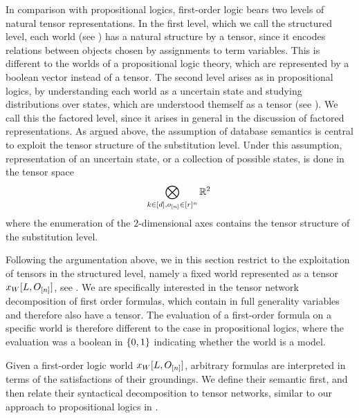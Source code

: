 In comparison with propositional logics, first-order logic bears two levels of natural tensor representations.
In the first level, which we call the structured level, each world (see ) has a natural structure by a tensor, since it encodes relations between objects chosen by assignments to term variables.
This is different to the worlds of a propositional logic theory, which are represented by a boolean vector instead of a tensor.
The second level arises as in propositional logics, by understanding each world as a uncertain state and studying distributions over states, which are understood themself as a tensor (see ).
We call this the factored level, since it arises in general in the discussion of factored representations.
As argued above, the assumption of database semantics is central to exploit the tensor structure of the substitution level.
Under this assumption, representation of an uncertain state, or a collection of possible states, is done in the tensor space
\begin{align*}
    \bigotimes_{k\in[d],o_{[n]}\in[r]^{n}} \mathbb{R}^2 \,
\end{align*}
where the enumeration of the $2$-dimensional axes contains the tensor structure of the substitution level.




Following the argumentation above, we in this section restrict to the exploitation of tensors in the structured level, namely a fixed world represented as a tensor $x_{W}[L,O_{[n]}]$, see .
We are specifically interested in the tensor network decomposition of first order formulas, which contain in full generality variables and therefore also have a tensor.
The evaluation of a first-order formula on a specific world is therefore different to the case in propositional logics, where the evaluation was a boolean in $\{0,1\}$ indicating whether the world is a model.


Given a first-order logic world $x_{W}[L,O_{[n]}]$, arbitrary formulas are interpreted in terms of the satisfactions of their groundings.
We define their semantic first, and then relate their syntactical decomposition to tensor networks, similar to our approach to propositional logics in .

